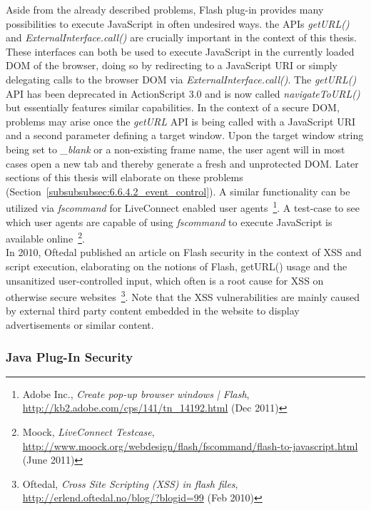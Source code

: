      Aside from the already described problems, Flash plug-in provides many possibilities to execute JavaScript in often undesired ways. the APIs \textit{getURL()} and \textit{ExternalInterface.call()} are crucially important in the context of this thesis. These interfaces can both be used to execute JavaScript in the currently loaded DOM of the browser, doing so by redirecting to a JavaScript URI or simply delegating calls to the browser DOM via \textit{ExternalInterface.call()}. The \textit{getURL()} API has been deprecated in ActionScript 3.0 and is now called \textit{navigateToURL()} but essentially features similar capabilities. In the context of a secure DOM, problems may arise once the \textit{getURL} API is being called with a JavaScript URI and a second parameter defining a target window. Upon the target window string being set to \textit{\_blank} or a non-existing frame name, the user agent will in most cases open a new tab and thereby generate a fresh and unprotected DOM. Later sections of this 
thesis will elaborate on these problems  (Section~\ref{subsubsubsec:6.6.4.2_event_control}). A similar functionality can be utilized via \textit{fscommand} for LiveConnect enabled user agents~\footnote{Adobe Inc., \textit{Create pop-up browser windows | Flash}, \url{http://kb2.adobe.com/cps/141/tn_14192.html} (Dec 2011)}. A test-case to see which user agents are capable of using \textit{fscommand} to execute JavaScript is available online~\footnote{Moock, \textit{LiveConnect Testcase}, \url{http://www.moock.org/webdesign/flash/fscommand/flash-to-javascript.html} (June 2011)}.\\

      In 2010, Oftedal published an article on Flash security in the context of XSS and script execution, elaborating on the notions of Flash, getURL() usage and the unsanitized user-controlled input, which often is a root cause for XSS on otherwise secure websites~\footnote{Oftedal, \textit{Cross Site Scripting (XSS) in flash files}, \url{http://erlend.oftedal.no/blog/?blogid=99} (Feb 2010)}. Note that the XSS vulnerabilities are mainly caused by external third party content embedded in the website to display advertisements or similar content.\\


      \subsubsection{Java Plug-In Security}
      \label{subsubsubsec:2.4.3.2.java_plugin_security}

